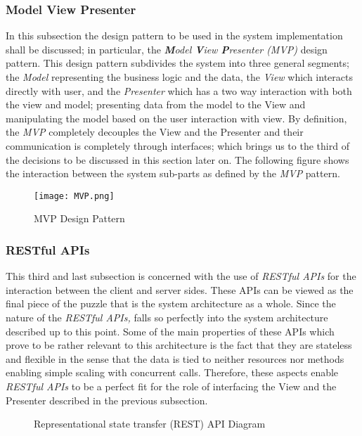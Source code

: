 \subsubsection{Model View Presenter}
In this subsection the design pattern to be used in the system implementation shall be discussed; in particular, the \emph{\textbf{M}odel \textbf{V}iew \textbf{P}resenter (MVP)} design pattern. This design pattern subdivides the system into three general segments; the \emph{Model} representing the business logic and the data, the \emph{View} which interacts directly with user, and the \emph{Presenter} which has a two way interaction with both the view and model; presenting data from the model to the View and manipulating the model based on the user interaction with view. By definition, the \emph{MVP} completely decouples the View and the Presenter and their communication is completely through interfaces; which brings us to the third of the decisions to be discussed in this section later on. The following figure shows the interaction between the system sub-parts as defined by the \emph{MVP} pattern.

\begin{figure}[H]
\caption{MVP Design Pattern}
\label{fig:MVP-desgn-patt}
\centering
\texttt{[image: MVP.png]}
\end{figure}

\subsubsection{RESTful APIs}
This third and last subsection is concerned with the use of \emph{RESTful APIs} for the interaction between the client and server sides. These APIs can be viewed as the final piece of the puzzle that is the system architecture as a whole. Since the nature of the \emph{RESTful APIs,} falls so perfectly into the system architecture described up to this point. Some of the main properties of these APIs which prove to be rather relevant to this architecture is the fact that they are stateless and flexible in the sense that the data is tied to neither resources nor methods enabling simple scaling with concurrent calls. Therefore, these aspects enable \emph{RESTful APIs} to be a perfect fit for the role of interfacing the View and the Presenter described in the previous subsection.


\begin{figure}[H]
\caption{Representational state transfer (REST) API Diagram}
\label{fig:REST-APIp}
\centering

\end{figure}

